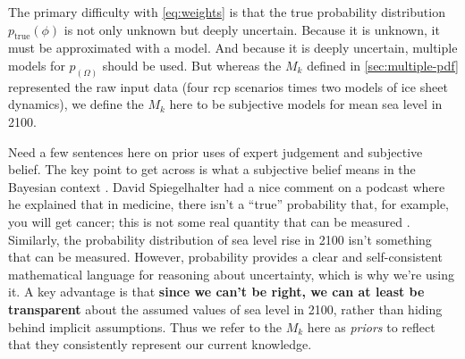 \documentclass[12pt]{article}
\newcommand{\klaus}[1]{\todo[color=rosso, textcolor=grigio]{\textbf{ATTN Klaus:~}#1}}
\begin{document}
The primary difficulty with \cref{eq:weights} is that the true probability distribution $p_\mathrm{true}(\phi)$ is not only unknown but deeply uncertain.
Because it is unknown, it must be approximated with a model.
And because it is deeply uncertain, multiple models for $p_(\Omega)$ should be used.
But whereas the $M_k$ defined in \cref{sec:multiple-pdf} represented the raw input data (four \gls{rcp} scenarios times two models of ice sheet dynamics), we define the $M_k$ here to be subjective models for mean sea level in 2100.

Need a few sentences here on prior uses of expert judgement and subjective belief.\klaus{Any suggested citations?}
The key point to get across is what a subjective belief means in the Bayesian context \citep{savage:1954,gelman_philosophy:2013,gelman_subjectiveobjective:2017}.
David Spiegelhalter had a nice comment on a podcast where he explained that in medicine, there isn't a ``true'' probability that, for example, you will get cancer; this is not some real quantity that can be measured \citep[hence the famous ``probability isn't real'' admonisment of][]{definetti_probability:1972}.
Similarly, the probability distribution of sea level rise in 2100 isn't something that can be measured.
However, probability provides a clear and self-consistent mathematical language for reasoning about uncertainty, which is why we're using it.
A key advantage is that \textbf{since we can't be right, we can at least be transparent} about the assumed values of sea level in 2100, rather than hiding behind implicit assumptions.
Thus we refer to the $M_k$ here as \emph{priors} to reflect that they consistently represent our current knowledge.
\end{document}
